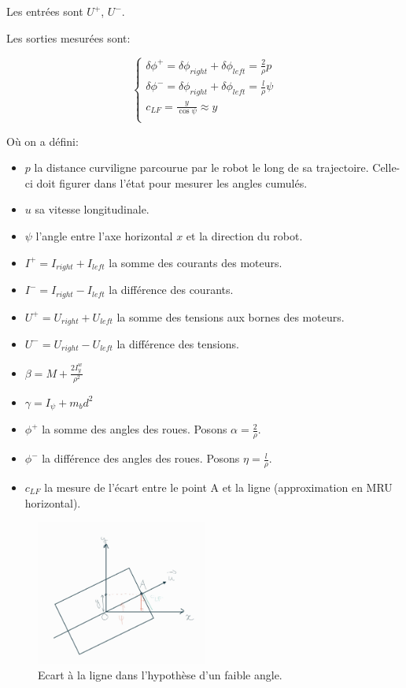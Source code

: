 \documentclass{report}
\begin{document}
Les entrées sont $U^{+}$, $U^{-}$.

Les sorties mesurées sont:

\begin{equation*}
    \begin{cases}
        \delta  \phi^{+} = \delta \phi_{right} + \delta \phi_{left} = \frac{2}{\rho}p \\
        \delta  \phi^{-} = \delta \phi_{right} + \delta \phi_{left} = \frac{l}{\rho}\psi \\
        c_{LF} = \frac{y}{\cos\psi} \approx y \\
    \end{cases}
\end{equation*}

Où on a défini:

\begin{itemize}
    \item $p$ la distance curviligne parcourue par le robot le long de sa trajectoire.
    Celle-ci doit figurer dans l'état pour mesurer les angles cumulés.
    \item $u$ sa vitesse longitudinale.
    \item $\psi$ l'angle entre l'axe horizontal $x$ et la direction du robot.
    \item $I^{+} = I_{right} + I_{left}$ la somme des courants des moteurs.
    \item $I^{-} = I_{right} - I_{left}$ la différence des courants.
    \item $U^{+} = U_{right} + U_{left}$ la somme des tensions aux bornes des moteurs.
    \item $U^{-} = U_{right} - U_{left}$ la différence des tensions.
    \item $\beta = M + \frac{2I^{w}_{y}}{\rho^2}$
    \item $\gamma = I_{\psi} + m_bd^2$
    \item $\phi^{+}$ la somme des angles des roues. Posons $\alpha = \frac{2}{\rho}$.
    \item $\phi^{-}$ la différence des angles des roues. Posons  $\eta = \frac{l}{\rho}$.
    \item $c_{LF}$ la mesure de l'écart entre le point A et la ligne (approximation en MRU horizontal).
\end{itemize}


\begin{figure}[h]  %
    \centering
    \includegraphics[width=0.5\textwidth]{figures/cLF_schema.jpg}
    \caption{Ecart à la ligne dans l'hypothèse d'un faible angle.}
\end{figure}
\end{document}

